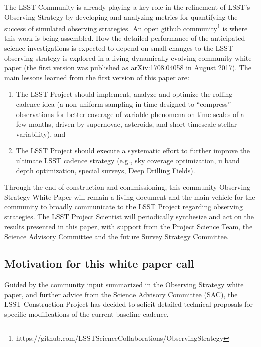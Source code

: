 \documentclass[DM,lsstdraft,toc,usenatbib]{lsstdoc}
\begin{document}
The LSST Community is already playing a key role in the refinement of LSST’s Observing Strategy 
by developing and analyzing metrics for quantifying the success of simulated observing strategies.
An open github community\footnote{
https://github.com/LSSTScienceCollaborations/ObservingStrategy}
is where this work is being assembled. How the detailed performance of the anticipated 
science investigations is expected to depend on small changes to the LSST observing 
strategy is explored in a living dynamically-evolving community white paper (the first
version was published as arXiv:1708.04058 in August 2017). The main lessons 
learned from the first version of this paper are: 
\begin{enumerate} 
\item The LSST Project should implement, analyze and optimize the rolling cadence idea
(a non-uniform sampling in time designed to ``compress'' observations for better coverage
of variable phenomena on time scales of a few months, driven by supernovae, asteroids, and
short-timescale stellar variability), and 
\item The LSST Project should execute a systematic effort to further improve the ultimate
LSST cadence strategy (e.g., sky coverage optimization, u band depth optimization, special 
surveys, Deep Drilling Fields). 
\end{enumerate} 

Through the end of construction and commissioning, this community Observing Strategy 
White Paper will remain a living document and the main vehicle for the community to broadly 
communicate to the LSST Project regarding observing strategies. The LSST Project Scientist will 
periodically synthesize and act on the results presented in this paper, with support from the 
Project Science Team, the Science Advisory Committee and the future Survey Strategy Committee.


\subsection{Motivation for this white paper call}

Guided by the community input summarized in the Observing Strategy white paper, and further 
advice from the Science Advisory Committee (SAC), the LSST Construction Project has decided to
solicit detailed technical proposals for specific modifications of the current baseline cadence.
\end{document}
